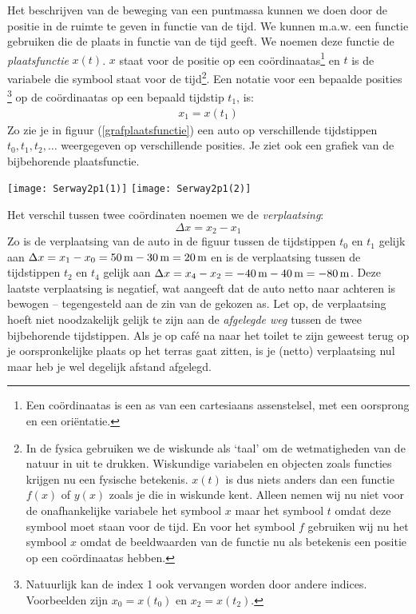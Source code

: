 \documentclass{ximera}
\begin{document}
	Het beschrijven van de beweging van een puntmassa kunnen we doen door de positie in de ruimte te geven in functie van de tijd. We kunnen m.a.w. een functie gebruiken die de plaats in functie van de tijd geeft. We noemen deze functie de \emph{plaatsfunctie} $x(t)$. $x$ staat voor de positie op een co\"ordinaatas\footnote{Een co\"ordinaatas is een as van een cartesiaans assenstelsel, met een oorsprong en een ori\"entatie.} en $t$ is de variabele die symbool staat voor de tijd\footnote{In de fysica gebruiken we de wiskunde als `taal' om de wetmatigheden van de natuur in uit te drukken. Wiskundige variabelen en objecten zoals functies krijgen nu een fysische betekenis. $x(t)$ is dus niets anders dan een functie $f(x)$ of $y(x)$ zoals je die in wiskunde kent. Alleen nemen wij nu niet voor de onafhankelijke variabele het symbool $x$ maar het symbool $t$ omdat deze symbool moet staan voor de tijd. En voor het symbool $f$ gebruiken wij nu het symbool $x$ omdat de beeldwaarden van de functie nu als betekenis een positie op een co\"ordinaatas hebben.}. Een notatie voor een bepaalde posities \footnote{Natuurlijk kan de index 1 ook vervangen worden door andere indices. Voorbeelden zijn $x_0=x(t_0)$ en $x_2=x(t_2)$.} op de co\"ordinaatas op een bepaald tijdstip $t_1$, is:
	\begin{eqnarray*}
	x_1=x(t_1)
	\end{eqnarray*}
	Zo zie je in figuur (\ref{grafplaatsfunctie}) een auto op verschillende tijdstippen $t_0,t_1, t_2,\ldots$ weer\-ge\-ge\-ven op verschillende posities. Je ziet ook een grafiek van de bijbehorende plaatsfunctie.
	
	\begin{image}
	\hfill
	\texttt{[image: Serway2p1(1)]}
	\hfill
	\texttt{[image: Serway2p1(2)]}
	\hfill
	
	\end{image}
	
	Het verschil tussen twee co\"ordinaten noemen we de \emph{verplaatsing}:
	\[
	\Delta x = x_2-x_1
	\]
	Zo is de verplaatsing van de auto in de figuur tussen de tijdstippen $t_0$ en $t_1$ gelijk aan $\Delta x = x_1-x_0=50\rm\,m-30\rm\,m=20\rm\,m$ en is de verplaatsing tussen de tijdstippen $t_2$ en $t_4$ gelijk aan $\Delta x=x_4-x_2=-40\rm\,m-40\rm\,m=-80\rm\,m$. Deze laatste verplaatsing is negatief, wat aangeeft dat de auto netto naar achteren is bewogen -- tegengesteld aan de zin van de gekozen as.
	Let op, de verplaatsing hoeft niet noodzakelijk gelijk te zijn aan de \emph{afgelegde weg} tussen de twee bijbehorende tijdstippen. Als je op caf\'e na naar het toilet te zijn geweest terug op je oorspronkelijke plaats op het terras gaat zitten, is je (netto) verplaatsing nul maar heb je wel degelijk afstand afgelegd.
	
\end{document}
